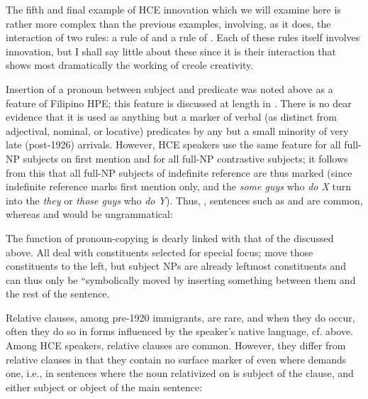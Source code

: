 The fifth and final example of HCE innovation which we will examine here is rather more complex than the previous examples, involving, as it does, the interaction of two rules: a rule of  and a rule of . Each of these rules itself involves inno\-vation, but I shall say little about these since it is their interaction that shows most dramatically the working of creole creativity.

Insertion of a pronoun between subject and predicate was noted above as a feature of Filipino HPE; this feature is discussed at length in \citet[3.6.1]{BickertonEtAl1976a}. There is no dear evidence that it is used as anything but a marker of verbal (as distinct from adjectival, nominal, or locative) predicates by any but a small minority of very late (post-1926) arrivals. However, HCE speakers use the same feature for all full-NP subjects on first mention and for all full-NP contrastive subjects; it follows from this that all full-NP subjects of indefinite refer\-ence are thus marked (since indefinite reference marks first mention only, and the \textit{some guys} who \textit{do X} turn into the \textit{they} or \textit{those guys} who \textit{do Y}). Thus, , sentences such as  and  are common, whereas  and  would be ungrammatical:

\z

\z

\z

\z

\noindent The function of pronoun-copying  is dearly linked with that of the  discussed above. All deal with constituents selected for special focus;  move those constituents to the left, but subject NPs are already leftmost constituents and can thus only be ``symbolically moved by inserting something between them and the rest of the sentence.

Relative clauses, among pre-1920 immigrants, are rare, and when they do occur, often they do so in forms influenced by the speaker's native language, cf.  above. Among HCE speakers, relative clauses are common. However, they differ from  relative clauses in that they contain no surface marker of  even where  demands one, i.e., in sentences where the noun relativized on is sub\-ject of the clause, and either subject  or object  of the main sentence:

